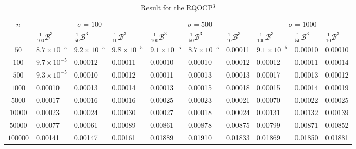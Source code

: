 \documentclass{article}
\theoremstyle{plain}
\begin{document}
\begin{table}[H]
\small
\centering
\caption{Result for the RQOCP$^3$}
\label{tab3}
\begin{tabular}{|c|lll|lll|lll|}
\hline
\multirow{2}{*}{$n$}  
  & \multicolumn{3}{c|}{$\sigma=100$} & \multicolumn{3}{c|}{$\sigma=500$} &\multicolumn{3}{c|}{$\sigma=1000$}\\
\cline{2-10}
 &  $\frac{1}{100}\mathcal{B}^3$ & $\frac{1}{50} \mathcal{B}^3$ & $\frac{1}{10}\mathcal{B}^3$& $\frac{1}{100}\mathcal{B}^3$ & $\frac{1}{50} \mathcal{B}^3$ & $\frac{1}{10}\mathcal{B}^3$& $\frac{1}{100}\mathcal{B}^3$ & $\frac{1}{50} \mathcal{B}^3$ & $\frac{1}{10}\mathcal{B}^3$\\
\hline
$50$  & $8.7 \times 10^{-5}$ & $9.2 \times 10^{-5}$ & $9.8 \times 10^{-5}$& $9.1 \times 10^{-5}$ & $8.7 \times 10^{-5}$  & 0.00011& $9.1 \times 10^{-5}$ & 0.00010  & 0.00010  \\
\hline
$100$  & $9.7 \times 10^{-5}$  & 0.00012 & 0.00011 & 0.00010 & 0.00010 & 0.00012  & 0.00012& 0.00011 & 0.00014   \\
\hline
$500$ & $9.3 \times 10^{-5}$  & 0.00010 & 0.00012& 0.00011 & 0.00013  &0.00013 & 0.00017 & 0.00013  & 0.00012 \\
\hline
$1000$  & 0.00010   & 0.00013 & 0.00014 & 0.00013 & 0.00015 &  0.00018 & 0.00015& 0.00014 & 0.00019   \\
\hline
$5000$ & 0.00017 & 0.00016 & 0.00016 & 0.00025 & 0.00023  &0.00021 & 0.00070 & 0.00022  &0.00025  \\
\hline
$10000$  & 0.00023  & 0.00024 & 0.00030&  0.00027& 0.00018  &0.00024 & 0.00131 & 0.00132  &0.00139  \\
\hline
$50000$ & 0.00077 & 0.00061 & 0.00089& 0.00861 & 0.00878  & 0.00875 & 0.00799 & 0.00871  & 0.00852  \\
\hline
$100000$  & 0.00141 & 0.00147 & 0.00161& 0.01889 & 0.01910  & 0.01833 & 0.01869 & 0.01850  & 0.01881  \\
\hline
\end{tabular}
\end{table}
\end{document}
